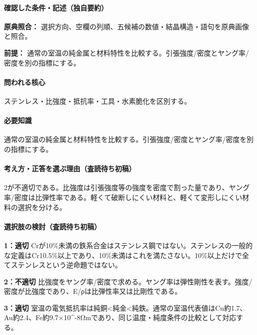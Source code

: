 \paragraph{確認した条件・記述（独自要約）}\mbox{}\par

\noindent\textbf{原典照合：} 選択方向、空欄の列順、五候補の数値・結晶構造・語句を原典画像と照合。\par

\noindent\textbf{前提：} 通常の室温の純金属と材料特性を比較する。引張強度/密度とヤング率/密度を別の指標にする。\par

\paragraph{問われる核心} ステンレス・比強度・抵抗率・工具・水素脆化を区別する。

\paragraph{必要知識} 通常の室温の純金属と材料特性を比較する。引張強度/密度とヤング率/密度を別の指標にする。

\paragraph{考え方・正答を選ぶ理由（査読待ち初稿）} 2が不適切である。比強度は引張強度等の強度を密度で割った量であり、ヤング率/密度は比弾性率である。軽くて破断しにくい材料と、軽くて変形しにくい材料の選択を分ける。

\paragraph{選択肢の検討（査読待ち初稿）}\mbox{}\par

\noindent\textbf{1：適切} Crが10\%未満の鉄系合金はステンレス鋼ではない。ステンレスの一般的な定義はCr10.5\%以上であり、10\%未満はこれを満たさない。10\%以上だけで全てステンレスという逆命題ではない。\par

\noindent\textbf{2：不適切} 比強度をヤング率/密度で求める。ヤング率は弾性剛性を表す。強度/密度が比強度であり、E/ρは比弾性率又は比剛性である。\par

\noindent\textbf{3：適切} 室温の電気抵抗率は純銅<純金<純鉄。通常の室温代表値はCu約1.7、Au約2.4、Fe約9.7×10\textasciicircum{}-8Ωmであり、同じ温度・純度条件の比較として対応する。\par

